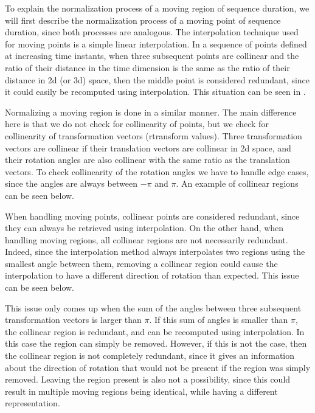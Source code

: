 To explain the normalization process of a moving region of sequence duration, we will first describe the normalization process of a moving point of sequence duration, since both processes are analogous. The interpolation technique used for moving points is a simple linear interpolation. In a sequence of points defined at increasing time instants, when three subsequent points are collinear and the ratio of their distance in the time dimension is the same as the ratio of their distance in 2d (or 3d) space, then the middle point is considered redundant, since it could easily be recomputed using interpolation. This situation can be seen in .

Normalizing a moving region is done in a similar manner. The main difference here is that we do not check for collinearity of points, but we check for collinearity of transformation vectors (rtransform values). Three transformation vectors are collinear if their translation vectors are collinear in 2d space, and their rotation angles are also collinear with the same ratio as the translation vectors. To check collinearity of the rotation angles we have to handle edge cases, since the angles are always between $-\pi$ and $\pi$. An example of collinear regions can be seen below.


When handling moving points, collinear points are considered redundant, since they can always be retrieved using interpolation. On the other hand, when handling moving regions, all collinear regions are not necessarily redundant. Indeed, since the interpolation method always interpolates two regions using the smallest angle between them, removing a collinear region could cause the interpolation to have a different direction of rotation than expected. This issue can be seen below.


This issue only comes up when the sum of the angles between three subsequent transformation vectors is larger than $\pi$. If this sum of angles is smaller than $\pi$, the collinear region is redundant, and can be recomputed using interpolation. In this case the region can simply be removed. However, if this is not the case, then the collinear region is not completely redundant, since it gives an information about the direction of rotation that would not be present if the region was simply removed. Leaving the region present is also not a possibility, since this could result in multiple moving regions being identical, while having a different representation.

